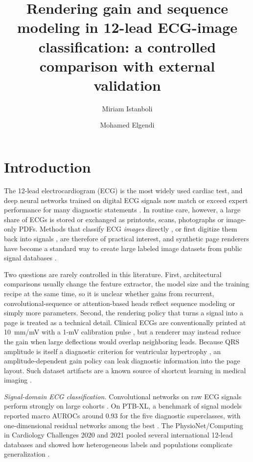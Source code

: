 \documentclass{wlscirep}
\title{Rendering gain and sequence modeling in 12-lead ECG-image classification: a controlled comparison with external validation}
\author[1]{Miriam Istanboli}
\author[2,*]{Mohamed  Elgendi}
\affil[1]{[Affiliation to be added]}
\affil[2]{[Affiliation to be added]}
\affil[*]{Corresponding author: [e-mail to be added]}
\begin{document}
\flushbottom
\maketitle
\thispagestyle{empty}

\section*{Introduction}
The 12-lead electrocardiogram (ECG) is the most widely used cardiac test, and deep neural networks trained on digital ECG signals now match or exceed expert performance for many diagnostic statements \cite{hannun2019cardiologist,ribeiro2020automatic,strodthoff2021benchmark,siontis2021ai}. In routine care, however, a large share of ECGs is stored or exchanged as printouts, scans, photographs or image-only PDFs. Methods that classify ECG \emph{images} directly \cite{sangha2022images}, or first digitize them back into signals \cite{reyna2024challenge,krones2024hough}, are therefore of practical interest, and synthetic page renderers have become a standard way to create large labeled image datasets from public signal databases \cite{shivashankara2024ecgimagekit}.

Two questions are rarely controlled in this literature. First, architectural comparisons usually change the feature extractor, the model size and the training recipe at the same time, so it is unclear whether gains from recurrent, convolutional-sequence or attention-based heads reflect sequence modeling or simply more parameters. Second, the rendering policy that turns a signal into a page is treated as a technical detail. Clinical ECGs are conventionally printed at 10~mm/mV with a 1-mV calibration pulse \cite{hancock2009hypertrophy,shivashankara2024ecgimagekit}, but a renderer may instead reduce the gain when large deflections would overlap neighboring leads. Because QRS amplitude is itself a diagnostic criterion for ventricular hypertrophy \cite{sokolow1949lvh}, an amplitude-dependent gain policy can leak diagnostic information into the page layout. Such dataset artifacts are a known source of shortcut learning in medical imaging \cite{geirhos2020shortcut,degrave2021covid,zech2018pneumonia}.

\emph{Signal-domain ECG classification.} Convolutional networks on raw ECG signals perform strongly on large cohorts \cite{hannun2019cardiologist,ribeiro2020automatic}. On PTB-XL, a benchmark of signal models reported macro AUROCs around 0.93 for the five diagnostic superclasses, with one-dimensional residual networks among the best \cite{strodthoff2021benchmark,wang2017timeseries}. The PhysioNet/Computing in Cardiology Challenges 2020 and 2021 pooled several international 12-lead databases and showed how heterogeneous labels and populations complicate generalization \cite{perezalday2020challenge,reyna2021challenge,reyna2022issues}.
\end{document}
